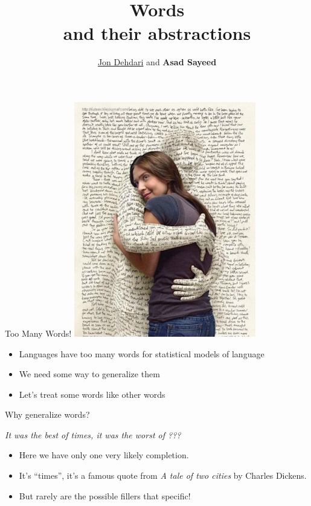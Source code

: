 \documentclass[xcolor=pdftex,x11names,table,hyperref]{beamer}
\begin{document}
\title{\LARGE{Words} \\[1.0em] \small{and their abstractions} \\[1.5em]
 }
\author{\href{http://jon.dehdari.org}{Jon Dehdari} and \textbf{Asad Sayeed}}
\frame{\titlepage}

\begin{frame}{Too Many Words!}
	{\center \includegraphics[width=0.33\textheight]{images/word-lover.jpg}}
\begin{itemize}
	\item Languages have too many words for statistical models of language
	\pause
	\item We need some way to generalize them
	\pause
	\item Let's treat some words like other words
\end{itemize}
\end{frame}

\begin{frame}{Why generalize words?}
  \begin{center}
    \textit{It was the best of times, it was the worst of ???}
  \end{center}\pause
  \begin{itemize}
  \item Here we have only one very likely completion.\pause
  \item It's ``times'', it's a famous 
    quote from \textit{A tale of two cities} by 
    Charles Dickens. \pause
  \item But rarely are the possible fillers that specific!
  \end{itemize}
\end{frame}
\end{document}
